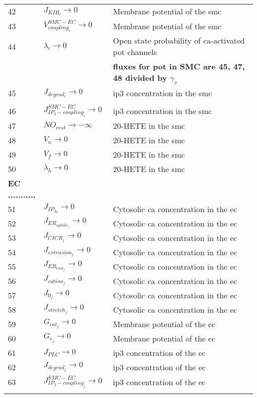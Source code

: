 \documentclass[]{article}
\newcommand{\pot}{\gls{pot}\xspace}
\newcommand{\ca}{\gls{ca}\xspace}
\newcommand{\ip}{\gls{ip3}\xspace}
\begin{document}
\begin{longtable}[h!] { p{0.12\linewidth}  p{0.28\linewidth}     p{0.6\linewidth} }
42 &    $ J_{KIR_{i}} \rightarrow 0$ & Membrane potential of the \gls{smc}\\
43 &    $V^{SMC-EC}_{coupling_{i}} \rightarrow 0$ &  Membrane potential of the \gls{smc}\\
44 &    $\lambda_{i}   \rightarrow 0$ &  Open state probability of \ca-activated \pot channels \\
 &   &  \textbf{fluxes for \pot in SMC are 45, 47, 48 divided by $\gamma_v$} \\
45 &    $ J_{degrad_{i}}\rightarrow 0$ & \ip concentration in the \gls{smc}\\
 &   &  \\
46 &    $ J^{SMC-EC}_{IP_{3}-coupling_{i}}\rightarrow 0$ & \ip concentration in the \gls{smc}\\
47 & $NO_{rest} \rightarrow -\infty $ & 20-HETE in the \gls{smc} \\
48 & $V_a \rightarrow 0$ & 20-HETE in the \gls{smc} \\
49 &    $ V_f\rightarrow 0$ &  20-HETE in the \gls{smc}\\
50 &    $ \lambda_h\rightarrow 0$ & 20-HETE in the \gls{smc} \\
 \textbf{EC ...........}   &  & \\
 51 &    $ J_{IP_{3j}}\rightarrow 0$ & Cytosolic \ca concentration in the \gls{ec} \\
 52 &    $ J_{ER_{uptake_{j}}}\rightarrow 0 $ &  Cytosolic \ca concentration in the \gls{ec}\\
 53 &    $J_{CICR_{j}} \rightarrow 0$ &Cytosolic \ca concentration in the \gls{ec} \\
 54 &    $ J_{extrusion_{j}} \rightarrow 0$ & Cytosolic \ca concentration in the \gls{ec}\\
 55 &    $J_{ER_{leak_{j}}} \rightarrow 0$ &Cytosolic \ca concentration in the \gls{ec} \\
 56 &    $ J_{cation_{j}}\rightarrow 0$ & Cytosolic \ca concentration in the \gls{ec}\\
 57 &    $ J_{0_{j}}\rightarrow 0$ & Cytosolic \ca concentration in the \gls{ec}\\
 58 &    $ J_{stretch_{j}} \rightarrow 0$ &Cytosolic \ca concentration in the \gls{ec} \\
 59 & $G_{cat_j} \rightarrow 0$ &Membrane potential of the \gls{ec} \\
 60 & $ G_{r_j} \rightarrow 0 $ &Membrane potential of the \gls{ec} \\
 61 &    $ J_{PLC}\rightarrow 0$ &\ip concentration of the \gls{ec} \\
 62 &    $ J_{degrad_{j}}  \rightarrow 0$ &\ip concentration of the \gls{ec} \\
 63 &    $ J^{SMC-EC}_{IP_{3}-coupling_{j}}\rightarrow 0$ & \ip concentration of the \gls{ec}\\
	\hline
	\label{tab:table1}
\end{longtable}
\end{document}
